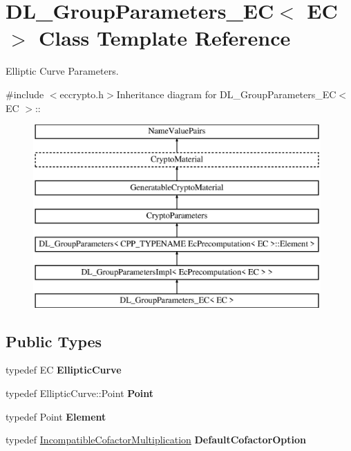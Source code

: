 \hypertarget{class_d_l___group_parameters___e_c}{
\section{DL\_\-GroupParameters\_\-EC$<$ EC $>$ Class Template Reference}
\label{class_d_l___group_parameters___e_c}
}


Elliptic Curve Parameters.  


{\ttfamily \#include $<$eccrypto.h$>$}Inheritance diagram for DL\_\-GroupParameters\_\-EC$<$ EC $>$::\begin{figure}[H]
\begin{center}
\leavevmode
\includegraphics[height=7cm]{class_d_l___group_parameters___e_c}
\end{center}
\end{figure}
\subsection*{Public Types}
\begin{DoxyCompactItemize}
\item 
\hypertarget{class_d_l___group_parameters___e_c_a27859965835a0eb8cf55959e666d64dd}{
typedef EC {\bfseries EllipticCurve}}
\label{class_d_l___group_parameters___e_c_a27859965835a0eb8cf55959e666d64dd}

\item 
\hypertarget{class_d_l___group_parameters___e_c_acae8a55704e14fbbd58cfd2766ef2cf3}{
typedef EllipticCurve::Point {\bfseries Point}}
\label{class_d_l___group_parameters___e_c_acae8a55704e14fbbd58cfd2766ef2cf3}

\item 
\hypertarget{class_d_l___group_parameters___e_c_ac191800038b554ba526b3f99062f06fc}{
typedef Point {\bfseries Element}}
\label{class_d_l___group_parameters___e_c_ac191800038b554ba526b3f99062f06fc}

\item 
\hypertarget{class_d_l___group_parameters___e_c_a53785d455939762593bd73af78aaa997}{
typedef \hyperlink{struct_enum_to_type}{IncompatibleCofactorMultiplication} {\bfseries DefaultCofactorOption}}
\label{class_d_l___group_parameters___e_c_a53785d455939762593bd73af78aaa997}

\end{DoxyCompactItemize}
